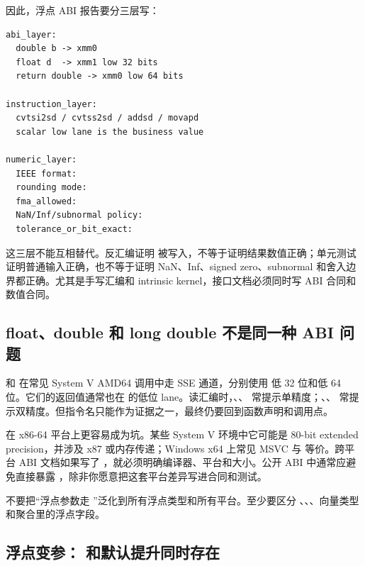 因此，浮点 ABI 报告要分三层写：

\begin{lstlisting}[numbers=none,caption={浮点 ABI 报告的三层字段}]
abi_layer:
  double b -> xmm0
  float d  -> xmm1 low 32 bits
  return double -> xmm0 low 64 bits

instruction_layer:
  cvtsi2sd / cvtss2sd / addsd / movapd
  scalar low lane is the business value

numeric_layer:
  IEEE format:
  rounding mode:
  fma_allowed:
  NaN/Inf/subnormal policy:
  tolerance_or_bit_exact:
\end{lstlisting}

这三层不能互相替代。反汇编证明  被写入，不等于证明结果数值正确；单元测试证明普通输入正确，也不等于证明 NaN、Inf、signed zero、subnormal 和舍入边界都正确。尤其是手写汇编和 intrinsic kernel，接口文档必须同时写 ABI 合同和数值合同。

\subsection{float、double 和 long double 不是同一种 ABI 问题}

 和  在常见 System V AMD64 调用中走 SSE 通道，分别使用  低 32 位和低 64 位。它们的返回值通常也在  的低位 lane。读汇编时，、、 常提示单精度；、、 常提示双精度。但指令名只能作为证据之一，最终仍要回到函数声明和调用点。

 在 x86-64 平台上更容易成为坑。某些 System V 环境中它可能是 80-bit extended precision，并涉及 x87 或内存传递；Windows x64 上常见 MSVC  与  等价。跨平台 ABI 文档如果写了 ，就必须明确编译器、平台和大小。公开 ABI 中通常应避免直接暴露 ，除非你愿意把这套平台差异写进合同和测试。

\begin{warningbox}
不要把“浮点参数走 ”泛化到所有浮点类型和所有平台。至少要区分 、、、向量类型和聚合里的浮点字段。
\end{warningbox}

\subsection{浮点变参： 和默认提升同时存在}

